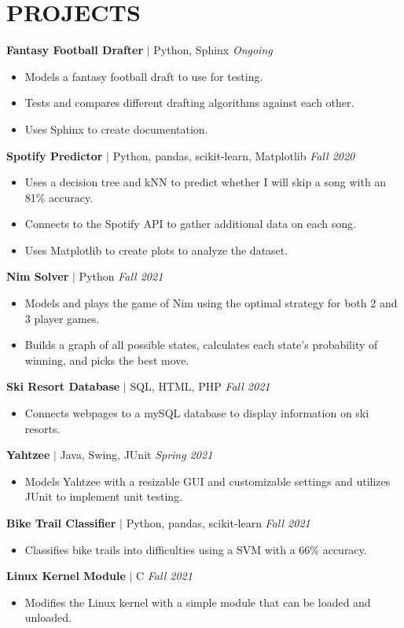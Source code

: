 \documentclass[11pt, a4paper, roman]{moderncv}
\newcommand{\project}[5]{
	\textbf{#1}
	$|$ #3 
	\hfill\textit{#4}
	#5
	\vspace{2mm}
}
\begin{document}
\section{PROJECTS}

\project{Fantasy Football Drafter}{https://github.com/GoneSahlin/fantasydraft}{Python, Sphinx}{Ongoing}
	{\begin{itemize}
		\item Models a fantasy football draft to use for testing.
		\item Tests and compares different drafting algorithms against each other.
		\item Uses Sphinx to create documentation.
	\end{itemize}
}
{\project{Spotify Predictor}{https://github.com/GoneSahlin/CPSC222Final}{Python, pandas, scikit-learn, Matplotlib}{Fall 2020}
	{\begin{itemize}
    		\item Uses a decision tree and kNN to predict whether I will skip a song with an 81\% accuracy.
    		\item Connects to the Spotify API to gather additional data on each song.
   		 \item Uses Matplotlib to create plots to analyze the dataset.
	\end{itemize}}
}
{\project{Nim Solver}{https://github.com/GoneSahlin/Nim}{Python}{Fall 2021}
	{\begin{itemize}
    		\item Models and plays the game of Nim using the optimal strategy for both 2 and 3 player games.
    		\item Builds a graph of all possible states, calculates each state's probability of winning, and picks the best move.
	\end{itemize}}
}
{\project{Ski Resort Database}{https://github.com/GoneSahlin/321_Final_Project}{SQL, HTML, PHP}{Fall 2021}
	{\begin{itemize}
    		\item Connects webpages to a mySQL database to display information on ski resorts.
	\end{itemize}}
}
{\project{Yahtzee}{https://github.com/Gonzaga-University/yahtzee-final-game-a-a-r-o-n}{Java, Swing, JUnit}{Spring 2021}
	{\begin{itemize}
    		\item Models Yahtzee with a resizable GUI and customizable settings and utilizes JUnit to implement unit testing.
	\end{itemize}}
}
{\project{Bike Trail Classifier}{https://github.com/GoneSahlin/BikeTrailSVM}{Python, pandas, scikit-learn}{Fall 2021}
	{\begin{itemize}
    		\item Classifies bike trails into difficulties using a SVM with a 66\% accuracy.
	\end{itemize}}
}
{\project{Linux Kernel Module}{https://github.com/GU-2021-Fall-CPSC346/hw5-linux-kernel-module-dev-GoneSahlin}{C}{Fall 2021}
	{\begin{itemize}
   		\item Modifies the Linux kernel with a simple module that can be loaded and unloaded.
	\end{itemize}}
}
\end{document}
